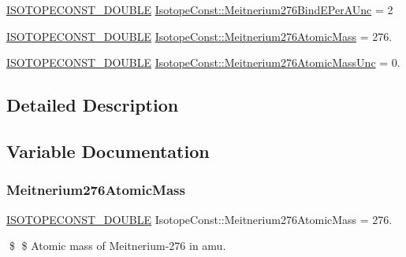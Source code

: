 \begin{DoxyCompactItemize}
\mbox{\hyperlink{group___isotope_const-_macros_ga8f45a7272ce02c0b4c65c44636ed719a}{I\+S\+O\+T\+O\+P\+E\+C\+O\+N\+S\+T\+\_\+\+D\+O\+U\+B\+LE}} \mbox{\hyperlink{group___isotope_const-_meitnerium-_mt276_ga3d7dc54197226572321b20f74d1328a4}{Isotope\+Const\+::\+Meitnerium276\+Bind\+E\+Per\+A\+Unc}} = 2
\item 
\mbox{\hyperlink{group___isotope_const-_macros_ga8f45a7272ce02c0b4c65c44636ed719a}{I\+S\+O\+T\+O\+P\+E\+C\+O\+N\+S\+T\+\_\+\+D\+O\+U\+B\+LE}} \mbox{\hyperlink{group___isotope_const-_meitnerium-_mt276_gac9751d7ca448296245ef0159705e9e2e}{Isotope\+Const\+::\+Meitnerium276\+Atomic\+Mass}} = 276.
\item 
\mbox{\hyperlink{group___isotope_const-_macros_ga8f45a7272ce02c0b4c65c44636ed719a}{I\+S\+O\+T\+O\+P\+E\+C\+O\+N\+S\+T\+\_\+\+D\+O\+U\+B\+LE}} \mbox{\hyperlink{group___isotope_const-_meitnerium-_mt276_ga297ce59da292684f39f6dcd77ad0b591}{Isotope\+Const\+::\+Meitnerium276\+Atomic\+Mass\+Unc}} = 0.
\end{DoxyCompactItemize}


\subsection{Detailed Description}


\subsection{Variable Documentation}
\mbox{\label{group___isotope_const-_meitnerium-_mt276_gac9751d7ca448296245ef0159705e9e2e}} 
\subsubsection{\texorpdfstring{Meitnerium276\+Atomic\+Mass}{Meitnerium276AtomicMass}}
{\footnotesize\ttfamily \mbox{\hyperlink{group___isotope_const-_macros_ga8f45a7272ce02c0b4c65c44636ed719a}{I\+S\+O\+T\+O\+P\+E\+C\+O\+N\+S\+T\+\_\+\+D\+O\+U\+B\+LE}} Isotope\+Const\+::\+Meitnerium276\+Atomic\+Mass = 276.}

\$ \$ Atomic mass of Meitnerium-\/276 in amu. \mbox{\label{group___isotope_const-_meitnerium-_mt276_ga297ce59da292684f39f6dcd77ad0b591}} 
